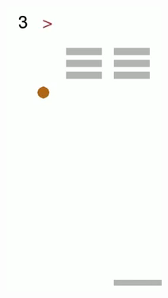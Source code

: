 \begin{figure}[h]
	\centering
	\begin{subfigure}[b]{0.23\textwidth}
		\includegraphics[width=\textwidth]{images/breakout-33-lr-1.png}
	\end{subfigure}
	~ %

\end{figure}
